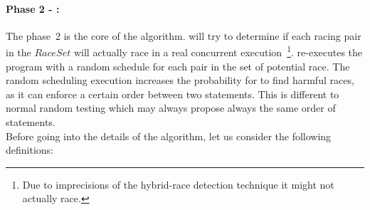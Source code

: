 \begin{refsection}
\paragraph{Phase 2 - \rfuz:}
The phase~2 is the core of the \rfuz algorithm.
%
\rfuz will try to determine if each racing pair in the $RaceSet$ will actually
race in a real concurrent execution~\footnote{Due to imprecisions of the
  hybrid-race detection technique it might not actually race.}.
%
\rfuz re-executes the program with a random schedule for each pair in the set
of potential race.
%
The random scheduling execution increases the probability for \rfuz to find
harmful races, as it can enforce a certain order between two statements.
%
This is different to normal random testing which may always propose always the
same order of statements.
%
%
%
\\

\noindent
Before going into the details of the \rfuz algorithm, let us consider the
following definitions:


\end{refsection}
